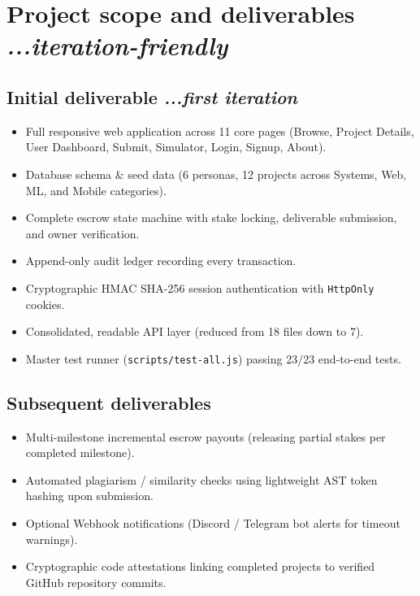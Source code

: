 \documentclass[11pt,a4paper]{article}
\begin{document}
\section{Project scope and deliverables \hfill \normalfont\small\textit{...iteration-friendly}}

\subsection{Initial deliverable \hfill \normalfont\small\textit{...first iteration}}
\begin{itemize}
    \item Full responsive web application across 11 core pages (Browse, Project Details, User Dashboard, Submit, Simulator, Login, Signup, About).
    \item Database schema \& seed data (6 personas, 12 projects across Systems, Web, ML, and Mobile categories).
    \item Complete escrow state machine with stake locking, deliverable submission, and owner verification.
    \item Append-only audit ledger recording every transaction.
    \item Cryptographic HMAC SHA-256 session authentication with \texttt{HttpOnly} cookies.
    \item Consolidated, readable API layer (reduced from 18 files down to 7).
    \item Master test runner (\texttt{scripts/test-all.js}) passing 23/23 end-to-end tests.
\end{itemize}

\subsection{Subsequent deliverables}
\begin{itemize}
    \item Multi-milestone incremental escrow payouts (releasing partial stakes per completed milestone).
    \item Automated plagiarism / similarity checks using lightweight AST token hashing upon submission.
    \item Optional Webhook notifications (Discord / Telegram bot alerts for timeout warnings).
    \item Cryptographic code attestations linking completed projects to verified GitHub repository commits.
\end{itemize}
\end{document}
